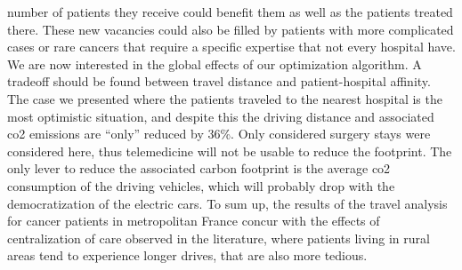 number of patients they receive could benefit them as well as the patients
treated there. These new vacancies could also be filled by patients with more
complicated cases or rare cancers that require a specific expertise that not
every hospital have. We are now interested in the global effects of our
optimization algorithm. A tradeoff should be found between travel distance and
patient-hospital affinity. The case we presented where the patients traveled to
the nearest hospital is the most optimistic situation, and despite this the
driving distance and associated \ac{co2} emissions are ``only'' reduced by 36\%.
Only considered surgery stays were considered here, thus telemedicine will not
be usable to reduce the footprint. The only lever to reduce the associated
carbon footprint is the average \ac{co2} consumption of the driving vehicles,
which will probably drop with the democratization of the electric cars. To sum
up, the results of the travel analysis for cancer patients in metropolitan
France concur with the effects of centralization of care observed in the
literature, where patients living in rural areas tend to experience longer
drives, that are also more tedious.
